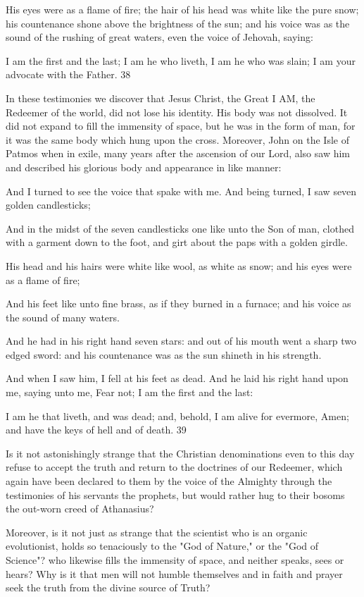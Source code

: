 His eyes were as a flame of fire; the hair of his head was white like the pure snow; his
countenance shone above the brightness of the sun; and his voice was as the sound of the
rushing of great waters, even the voice of Jehovah, saying:

I am the first and the last; I am he who liveth, I am he who was slain; I am your advocate
with the Father. 38

In these testimonies we discover that Jesus Christ, the Great I AM, the Redeemer of the
world, did not lose his identity. His body was not dissolved. It did not expand to fill the
immensity of space, but he was in the form of man, for it was the same body which hung
upon the cross. Moreover, John on the Isle of Patmos when in exile, many years after the
ascension of our Lord, also saw him and described his glorious body and appearance in like
manner:

And I turned to see the voice that spake with me. And being turned, I saw seven golden
candlesticks;

And in the midst of the seven candlesticks one like unto the Son of man, clothed with a
garment down to the foot, and girt about the paps with a golden girdle.

His head and his hairs were white like wool, as white as snow; and his eyes were as a flame
of fire;

And his feet like unto fine brass, as if they burned in a furnace; and his voice as the sound of
many waters.

And he had in his right hand seven stars: and out of his mouth went a sharp two edged sword:
and his countenance was as the sun shineth in his strength.

And when I saw him, I fell at his feet as dead. And he laid his right hand upon me, saying
unto me, Fear not; I am the first and the last:

I am he that liveth, and was dead; and, behold, I am alive for evermore, Amen; and have the
keys of hell and of death. 39

Is it not astonishingly strange that the Christian denominations even to this day refuse to
accept the truth and return to the doctrines of our Redeemer, which again have been declared
to them by the voice of the Almighty through the testimonies of his servants the prophets, but
would rather hug to their bosoms the out-worn creed of Athanasius?

Moreover, is it not just as strange that the scientist who is an organic evolutionist, holds so
tenaciously to the "God of Nature," or the "God of Science"? who likewise fills the
immensity of space, and neither speaks, sees or hears? Why is it that men will not humble
themselves and in faith and prayer seek the truth from the divine source of Truth?

